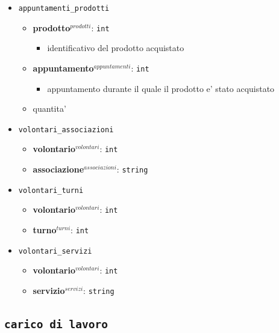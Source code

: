 \documentclass[]{article}
\providecommand{\tightlist}{%
  \setlength{\itemsep}{0pt}\setlength{\parskip}{0pt}}
\begin{document}
\begin{itemize}
\item
  \texttt{appuntamenti\_prodotti}

  \begin{itemize}
  \tightlist
  \item
    \textbf{prodotto}\(^{prodotti}\): \texttt{int}

    \begin{itemize}
    \tightlist
    \item
      identificativo del prodotto acquistato
    \end{itemize}
  \item
    \textbf{appuntamento}\(^{appuntamenti}\): \texttt{int}

    \begin{itemize}
    \tightlist
    \item
      appuntamento durante il quale il prodotto e' stato acquistato
    \end{itemize}
  \item
    quantita'
  \end{itemize}
\item
  \texttt{volontari\_associazioni}

  \begin{itemize}
  \tightlist
  \item
    \textbf{volontario}\(^{volontari}\): \texttt{int}
  \item
    \textbf{associazione}\(^{associazioni}\): \texttt{string}
  \end{itemize}
\item
  \texttt{volontari\_turni}

  \begin{itemize}
  \tightlist
  \item
    \textbf{volontario}\(^{volontari}\): \texttt{int}
  \item
    \textbf{turno}\(^{turni}\): \texttt{int}
  \end{itemize}
\item
  \texttt{volontari\_servizi}

  \begin{itemize}
  \tightlist
  \item
    \textbf{volontario}\(^{volontari}\): \texttt{int}
  \item
    \textbf{servizio}\(^{servizi}\): \texttt{string}
  \end{itemize}
\end{itemize}

\hypertarget{carico-di-lavoro}{%
\subsection{\texorpdfstring{\texttt{carico\ di\ lavoro}}{carico di lavoro}}\label{carico-di-lavoro}}
\end{document}
